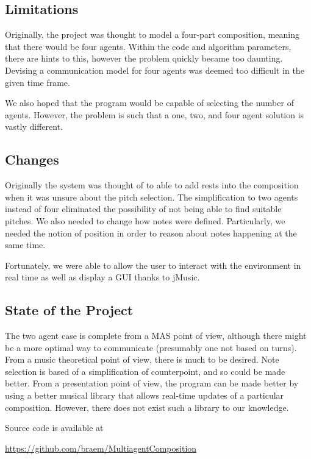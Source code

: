 \documentclass[12pt]{article}
\begin{document}
	\subsection{Limitations}
	Originally, the project was thought to model a four-part composition, meaning that there would be four agents. Within the code and algorithm parameters, there are hints to this, however the problem quickly became too daunting. Devising a communication model for four agents was deemed too difficult in the given time frame.
	
	We also hoped that the program would be capable of selecting the number of agents. However, the problem is such that a one, two, and four agent solution is vastly different.

	\subsection{Changes}
	Originally the system was thought of to able to add rests into the composition when it was unsure about the pitch selection. The simplification to two agents instead of four eliminated the possibility of not being able to find suitable pitches. We also needed to change how notes were defined. Particularly, we needed the notion of position in order to reason about notes happening at the same time. 
	
	Fortunately, we were able to allow the user to interact with the environment in real time as well as display a GUI thanks to jMusic. 
	
	\subsection{State of the Project}
	The two agent case is complete from a MAS point of view, although there might be a more optimal way to communicate (presumably one not based on turns). From a music theoretical point of view, there is much to be desired. Note selection is based of a simplification of counterpoint, and so could be made better. From a presentation point of view, the program can be made better by using a better musical library that allows real-time updates of a particular composition. However, there does not exist such a library to our knowledge.
	
	\vspace{0.5cm}
	\Large
	\noindent Source code is available at
	
	\url{https://github.com/braem/MultiagentComposition}
	\normalsize
	
	
	{}
\end{document}
